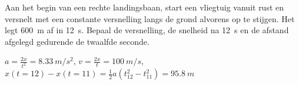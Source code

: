\documentclass{ximera}
\begin{document}
\begin{exercise}
    Aan het begin van een rechte landingsbaan, start een vliegtuig vanuit rust en versnelt met een constante versnelling langs de grond alvorens op te stijgen. Het legt \SI{600}{m} af in \SI{12}{s}. Bepaal de versnelling, de snelheid na \SI{12}{s} en de afstand afgelegd gedurende de twaalfde seconde.

    \begin{oplossing}
        $a=\frac{2x}{t^2}=\SI{8,33}{m/s^2}$,
        $v=\frac{2x}{t}=\SI{100}{m/s}$,
        $x(t=12)-x(t=11)=\frac{1}{2}a(t_{12}^2-t_{11}^2)=\SI{95,8}{m}$
    \end{oplossing}
\end{exercise}


\begin{exercise}


\end{exercise}
\end{document}
